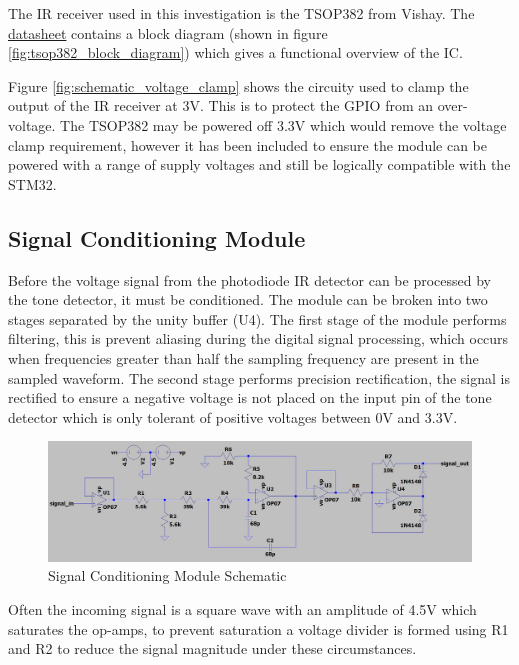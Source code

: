 The IR receiver used in this investigation is the TSOP382 from Vishay. The \href{https://www.vishay.com/docs/82491/tsop382.pdf}{datasheet} contains a block diagram (shown in figure \ref{fig:tsop382_block_diagram}) which gives a functional overview of the IC.

Figure \ref{fig:schematic_voltage_clamp} shows the circuity used to clamp the output of the IR receiver at 3V. This is to protect the GPIO from an over-voltage. The TSOP382 may be powered off 3.3V which would remove the voltage clamp requirement, however it has been included to ensure the module can be powered with a range of supply voltages and still be logically compatible with the STM32.

\subsection{Signal Conditioning Module}

Before the voltage signal from the photodiode IR detector can be processed by the tone detector, it must be conditioned. The module can be broken into two stages separated by the unity buffer (U4). The first stage of the module performs filtering, this is prevent aliasing during the digital signal processing, which occurs when frequencies greater than half the sampling frequency are present in the sampled waveform. The second stage performs precision rectification, the signal is rectified to ensure a negative voltage is not placed on the input pin of the tone detector which is only tolerant of positive voltages between 0V and 3.3V.

\begin{figure}[H]
	\centering
	\includegraphics[width=\textwidth]{figures/design/filter_and_rectify}
	\caption{Signal Conditioning Module Schematic}
	\label{fig:schematic_filter_and_rectify}
\end{figure}

Often the incoming signal is a square wave with an amplitude of 4.5V which saturates the op-amps, to prevent saturation a voltage divider is formed using R1 and R2 to reduce the signal magnitude under these circumstances.

